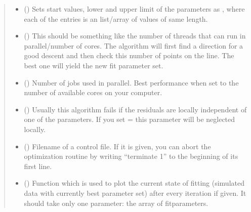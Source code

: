 \documentclass[letterpaper,10pt,english]{sphinxmanual}
\begin{document}
\begin{fulllineitems}
\begin{quote}
\begin{description}
\begin{itemize}
\item {} 
 () \textendash{} Sets start values, lower and upper limit of the parameters as , where each of the entries is an list/array of values of same length.

\item {} 
 () \textendash{} This should be something like the number of threads that can run in parallel/number of cores. The algorithm will first find a direction for a good descent and then check this number of points on the line. The best one will yield the new fit parameter set.

\item {} 
 () \textendash{} Number of jobs used in parallel. Best performance when set to the number of available cores on your computer.

\item {} 
 () \textendash{} Usually this algorithm fails if the residuals are locally independent of one of the parameters. If you set  =  this parameter will be neglected locally.

\item {} 
 () \textendash{} Filename of a control file. If it is given, you can abort the optimization routine by writing “terminate 1” to the beginning of its first line.

\item {} 
 () \textendash{} Function which is used to plot the current state of fitting (simulated data with currently best parameter set) after every iteration if given. It should take only one parameter: the array of fitparameters.

\end{itemize}

\end{description}\end{quote}

\end{fulllineitems}
\end{document}
